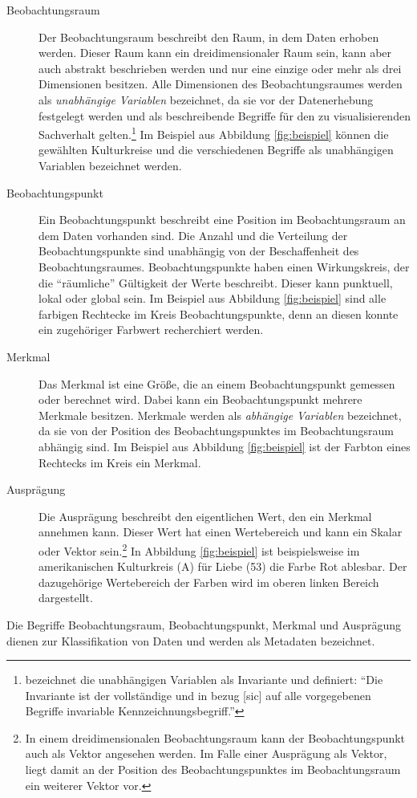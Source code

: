 \documentclass[a4paper, 
               12pt,
               DIV=calc,
               version=first,
               pdftex,
               headsepline,
               footsepline,
               bibtotocnumbered,
               liststotocnumbered]{scrreprt}
\begin{document}
\begin{description}
\item[Beobachtungsraum]
Der Beobachtungsraum beschreibt den Raum, in dem Daten erhoben werden. Dieser Raum kann ein
dreidimensionaler Raum sein, kann aber auch abstrakt beschrieben werden und nur eine einzige oder
mehr als drei Dimensionen besitzen. Alle Dimensionen des Beobachtungsraumes werden als \textit{unabhängige
Variablen} bezeichnet, da sie vor der Datenerhebung festgelegt werden und als beschreibende Begriffe für
den zu visualisierenden Sachverhalt gelten.\footnote{\citep[S.\,24]{Bertin} bezeichnet die unabhängigen
Variablen als Invariante und definiert: "`Die Invariante ist der vollständige und in bezug [sic] auf alle vorgegebenen
Begriffe invariable Kennzeichnungsbegriff."'} Im Beispiel aus Abbildung \ref{fig:beispiel} können die
gewählten Kulturkreise und die verschiedenen Begriffe als unabhängigen Variablen bezeichnet werden.
\item[Beobachtungspunkt]
Ein Beobachtungspunkt beschreibt eine Position im Beobachtungsraum an dem Daten vorhanden sind. Die Anzahl und die Verteilung
der Beobachtungspunkte sind unabhängig von der Beschaffenheit des Beobachtungsraumes. Beobachtungspunkte haben einen
Wirkungskreis, der die "`räumliche"' Gültigkeit der Werte beschreibt. Dieser kann punktuell, lokal oder global sein.
Im Beispiel aus Abbildung \ref{fig:beispiel} sind alle farbigen Rechtecke im Kreis Beobachtungspunkte, denn an
diesen konnte ein zugehöriger Farbwert recherchiert werden.
\item[Merkmal]
Das Merkmal ist eine Größe, die an einem Beobachtungspunkt gemessen oder berechnet wird. Dabei kann
ein Beobachtungspunkt mehrere Merkmale besitzen. Merkmale werden als \textit{abhängige Variablen} bezeichnet, da
sie von der Position des Beobachtungspunktes im Beobachtungsraum abhängig sind.
Im Beispiel aus Abbildung \ref{fig:beispiel} ist der Farbton eines Rechtecks im Kreis ein Merkmal.
\item[Ausprägung]
Die Ausprägung beschreibt den eigentlichen Wert, den ein Merkmal annehmen kann. Dieser Wert hat einen
Wertebereich und kann ein Skalar oder Vektor sein.\footnote{In einem dreidimensionalen Beobachtungsraum
kann der Beobachtungspunkt auch als Vektor angesehen werden. Im Falle einer Ausprägung als Vektor, liegt damit
an der Position des Beobachtungspunktes im Beobachtungsraum ein weiterer Vektor vor.}
In Abbildung \ref{fig:beispiel} ist beispielsweise im amerikanischen Kulturkreis (A) für Liebe (53) die Farbe
Rot ablesbar. Der dazugehörige Wertebereich der Farben wird im oberen linken Bereich dargestellt.
\end{description}
Die Begriffe Beobachtungsraum, Beobachtungspunkt, Merkmal und Ausprägung dienen zur Klassifikation von Daten
und werden als Metadaten bezeichnet.
\end{document}
